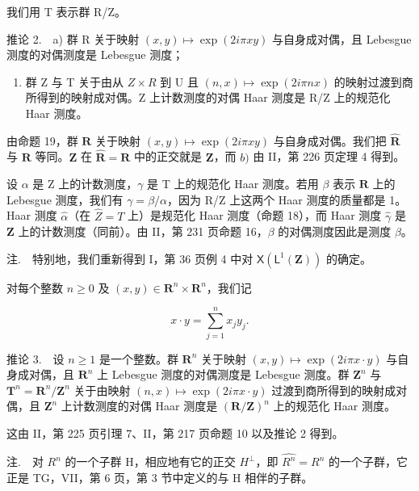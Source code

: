 我们用 T 表示群 R/Z。

推论 2.　a) 群 R 关于映射 \((x,y)\mapsto\exp(2i\pi xy)\) 与自身成对偶，且 Lebesgue 测度的对偶测度是 Lebesgue 测度；

\begin{enumerate}
\def\labelenumi{\alph{enumi})}
\setcounter{enumi}{1}
\tightlist
\item
  群 Z 与 T 关于由从 \(Z \times R\) 到 U 且 \((n, x) \mapsto \exp(2i\pi nx)\) 的映射过渡到商所得到的映射成对偶。Z 上计数测度的对偶 Haar 测度是 R/Z 上的规范化 Haar 测度。
\end{enumerate}

由命题 19，群 \(\mathbf{R}\) 关于映射 \((x,y)\mapsto \exp (2i\pi xy)\) 与自身成对偶。我们把 \(\widehat{\mathbf{R}}\) 与 \(\mathbf{R}\) 等同。\(\mathbf{Z}\) 在 \(\widehat{\mathbf{R}} = \mathbf{R}\) 中的正交就是 \(\mathbf{Z}\)，而 \(b)\) 由 II，第 226 页定理 4 得到。

设 \(\alpha\) 是 Z 上的计数测度，\(\gamma\) 是 T 上的规范化 Haar 测度。若用 \(\beta\) 表示 \(\mathbf{R}\) 上的 Lebesgue 测度，我们有 \(\gamma = \beta/\alpha\)，因为 R/Z 上这两个 Haar 测度的质量都是 1。Haar 测度 \(\widehat{\alpha}\)（在 \(\widehat{Z} = T\) 上）是规范化 Haar 测度（命题 18），而 Haar 测度 \(\widehat{\gamma}\) 是 \(\mathbf{Z}\) 上的计数测度（同前）。由 II，第 231 页命题 16，\(\beta\) 的对偶测度因此是测度 \(\beta\)。

注.　特别地，我们重新得到 I，第 36 页例 4 中对 \(\mathsf{X}(\mathsf{L}^{1}(\mathbf{Z}))\) 的确定。

对每个整数 \(n \geqslant 0\) 及 \((x, y) \in \mathbf{R}^n \times \mathbf{R}^n\)，我们记

\[
x \cdot y = \sum_ {j = 1} ^ {n} x _ {j} y _ {j}.
\]

推论 3.　设 \(n \geqslant 1\) 是一个整数。群 \(\mathbf{R}^{n}\) 关于映射 \((x,y) \mapsto \exp(2i\pi x \cdot y)\) 与自身成对偶，且 \(\mathbf{R}^{n}\) 上 Lebesgue 测度的对偶测度是 Lebesgue 测度。群 \(\mathbf{Z}^{n}\) 与 \(\mathbf{T}^{n} = \mathbf{R}^{n}/\mathbf{Z}^{n}\) 关于由映射 \((n,x) \mapsto \exp(2i\pi x \cdot y)\) 过渡到商所得到的映射成对偶，且 \(\mathbf{Z}^{n}\) 上计数测度的对偶 Haar 测度是 \((\mathbf{R}/\mathbf{Z})^{n}\) 上的规范化 Haar 测度。

这由 II，第 225 页引理 7、II，第 217 页命题 10 以及推论 2 得到。

注.　对 \(R^{n}\) 的一个子群 H，相应地有它的正交 \(H^{\perp}\)，即 \(\widehat{R^{n}} = R^{n}\) 的一个子群，它正是 TG，VII，第 6 页，第 3 节中定义的与 H 相伴的子群。

